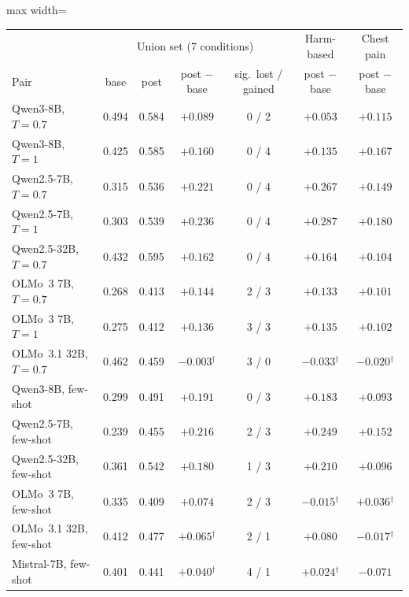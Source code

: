 \documentclass[11pt]{article}
\begin{document}
\begin{table}[t]
\centering\small
\begin{adjustbox}{max width=\linewidth}
\begin{tabular}{lcccccc}
\toprule
 & \multicolumn{4}{c}{Union set (7 conditions)} & Harm-based & Chest pain \\
Pair & base & post & post $-$ base & sig.\ lost / gained & post $-$ base & post $-$ base \\
\midrule
Qwen3-8B, $T{=}0.7$ & 0.494 & 0.584 & $+0.089$ & 0 / 2 & $+0.053$ & $+0.115$ \\
Qwen3-8B, $T{=}1$ & 0.425 & 0.585 & $+0.160$ & 0 / 4 & $+0.135$ & $+0.167$ \\
Qwen2.5-7B, $T{=}0.7$ & 0.315 & 0.536 & $+0.221$ & 0 / 4 & $+0.267$ & $+0.149$ \\
Qwen2.5-7B, $T{=}1$ & 0.303 & 0.539 & $+0.236$ & 0 / 4 & $+0.287$ & $+0.180$ \\
Qwen2.5-32B, $T{=}0.7$ & 0.432 & 0.595 & $+0.162$ & 0 / 4 & $+0.164$ & $+0.104$ \\
OLMo~3 7B, $T{=}0.7$ & 0.268 & 0.413 & $+0.144$ & 2 / 3 & $+0.133$ & $+0.101$ \\
OLMo~3 7B, $T{=}1$ & 0.275 & 0.412 & $+0.136$ & 3 / 3 & $+0.135$ & $+0.102$ \\
OLMo~3.1 32B, $T{=}0.7$ & 0.462 & 0.459 & $-0.003$$^{\dagger}$ & 3 / 0 & $-0.033$$^{\dagger}$ & $-0.020$$^{\dagger}$ \\
\midrule
Qwen3-8B, few-shot & 0.299 & 0.491 & $+0.191$ & 0 / 3 & $+0.183$ & $+0.093$ \\
Qwen2.5-7B, few-shot & 0.239 & 0.455 & $+0.216$ & 2 / 3 & $+0.249$ & $+0.152$ \\
Qwen2.5-32B, few-shot & 0.361 & 0.542 & $+0.180$ & 1 / 3 & $+0.210$ & $+0.096$ \\
OLMo~3 7B, few-shot & 0.335 & 0.409 & $+0.074$ & 2 / 3 & $-0.015$$^{\dagger}$ & $+0.036$$^{\dagger}$ \\
OLMo~3.1 32B, few-shot & 0.412 & 0.477 & $+0.065$$^{\dagger}$ & 2 / 1 & $+0.080$ & $-0.017$$^{\dagger}$ \\
Mistral-7B, few-shot & 0.401 & 0.441 & $+0.040$$^{\dagger}$ & 4 / 1 & $+0.024$$^{\dagger}$ & $-0.071$ \\
\bottomrule
\end{tabular}
\end{adjustbox}


\end{table}
\end{document}
